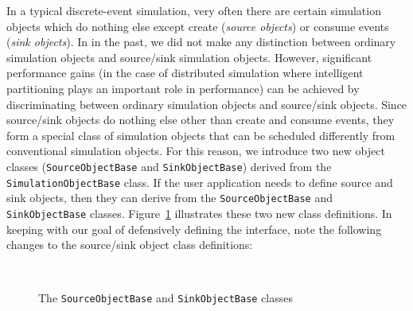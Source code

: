 \documentclass[11pt]{article}
\begin{document}
In a typical discrete-event simulation, very often there are certain
simulation objects which do nothing else except create (\emph{source
objects}) or consume events (\emph{sink objects}).  In in the past, we did
not make any distinction between ordinary simulation objects and
source/sink simulation objects.  However, significant performance gains
(in the case of distributed simulation where intelligent partitioning
plays an important role in performance) can be achieved by discriminating
between ordinary simulation objects and source/sink objects.  Since
source/sink objects do nothing else other than create and consume events,
they form a special class of simulation objects that can be scheduled
differently from conventional simulation objects.  For this reason, we
introduce two new object classes (\texttt{SourceObjectBase} and
\texttt{SinkObjectBase}) derived from the \texttt{SimulationObjectBase}
class.  If the user application needs to define source and sink objects,
then they can derive from the \texttt{SourceObjectBase} and
\texttt{SinkObjectBase} classes.  Figure~\ref{fig:sourceAndSinkObjectBase}
illustrates these two new class definitions.  In keeping with our goal of
defensively defining the interface, note the following changes to the
source/sink object class definitions: 

\begin{figure}
\begin{center}
\ 
\end{center}
\caption{The {\tt SourceObjectBase} and {\tt SinkObjectBase} classes}\label{fig:sourceAndSinkObjectBase}
\end{figure}
\end{document}
